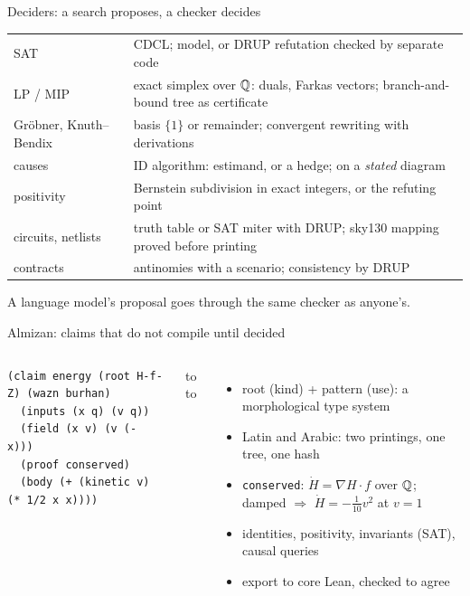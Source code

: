 \documentclass[aspectratio=169,11pt]{beamer}
\begin{document}
\begin{frame}{Deciders: a search proposes, a checker decides}
\small
\begin{tabularx}{\linewidth}{@{}lX@{}}
\toprule
SAT & CDCL; model, or DRUP refutation checked by separate code \\
LP / MIP & exact simplex over $\mathbb{Q}$: duals, Farkas vectors; branch-and-bound tree as certificate \\
Gröbner, Knuth--Bendix & basis $\{1\}$ or remainder; convergent rewriting with derivations \\
causes & ID algorithm: estimand, or a hedge; on a \emph{stated} diagram \\
positivity & Bernstein subdivision in exact integers, or the refuting point \\
circuits, netlists & truth table or SAT miter with DRUP; sky130 mapping proved before printing \\
contracts & antinomies with a scenario; consistency by DRUP \\
\bottomrule
\end{tabularx}

\vspace{0.6em}
A language model's proposal goes through the same checker as anyone's.
\end{frame}

\begin{frame}[fragile]{Almizan: claims that do not compile until decided}
\begin{columns}[T]
\begin{lstlisting}[basicstyle=\ttfamily\footnotesize]
(claim energy (root H-f-Z) (wazn burhan)
  (inputs (x q) (v q))
  (field (x v) (v (- x)))
  (proof conserved)
  (body (+ (kinetic v) (* 1/2 x x))))
\end{lstlisting}
\vspace{-0.6em}
{\small\raggedleft
\hbox to 
\hbox to \par}
\small
\begin{itemize}
\item root (kind) + pattern (use): a morphological type system
\item Latin and Arabic: two printings, one tree, one hash
\item \texttt{conserved}: $\dot H = \nabla H\cdot f$ over $\mathbb{Q}$; damped $\Rightarrow$ $\dot H = -\tfrac1{10}v^2$ at $v{=}1$
\item identities, positivity, invariants (SAT), causal queries
\item export to core Lean, checked to agree
\end{itemize}
\end{columns}
\end{frame}
\end{document}

